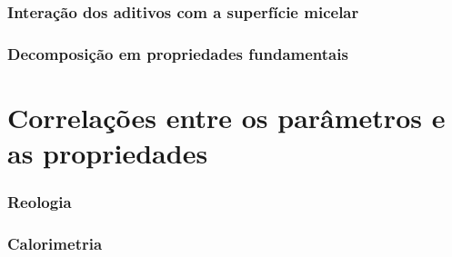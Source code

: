 		\subsection{Interação dos aditivos com a superfície micelar}
		\subsection{Decomposição em propriedades fundamentais}
	\chapter{Correlações entre os parâmetros e as propriedades}
		\subsection{Reologia}
		\subsection{Calorimetria}
